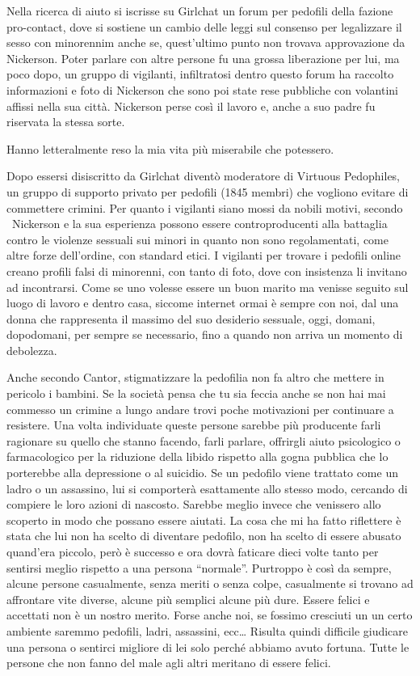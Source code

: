 \documentclass[12pt]{book} %
\begin{document}
Nella ricerca di aiuto si iscrisse su Girlchat un forum per pedofili della fazione
{\textquotedbl}pro-contact{\textquotedbl}, dove si sostiene un cambio delle leggi sul consenso per legalizzare il sesso
con minorennim anche se, quest'ultimo punto non trovava approvazione da Nickerson. Poter parlare con altre persone fu
una grossa liberazione per lui, ma poco dopo, un gruppo di vigilanti, infiltratosi dentro questo forum ha raccolto
informazioni e foto di Nickerson che sono poi state rese pubbliche con volantini affissi nella sua città. Nickerson
perse così il lavoro e, anche a suo padre fu riservata la stessa sorte.

{\textquotedbl}Hanno letteralmente reso la mia vita più miserabile che potessero{\textquotedbl}.

Dopo essersi disiscritto da Girlchat diventò moderatore di Virtuous Pedophiles, un gruppo di supporto privato per
pedofili (1845 membri) che vogliono evitare di commettere crimini. Per quanto i vigilanti siano mossi da nobili motivi,
secondo \ Nickerson e la sua esperienza possono essere controproducenti alla battaglia contro le violenze sessuali sui
minori in quanto non sono regolamentati, come altre forze dell'ordine, con standard etici. I
vigilanti per trovare i pedofili online creano profili falsi di minorenni, con tanto di foto, dove con insistenza li
invitano ad incontrarsi. Come se uno volesse essere un buon marito ma venisse seguito sul luogo di lavoro e dentro
casa, siccome internet ormai è sempre con noi, dal una donna che rappresenta il massimo del suo desiderio sessuale,
oggi, domani, dopodomani, per sempre se necessario, fino a quando non arriva un momento di debolezza.

Anche secondo Cantor, stigmatizzare la pedofilia non fa altro che mettere in pericolo i bambini. Se la società pensa che
tu sia feccia anche se non hai mai commesso un crimine a lungo andare trovi poche motivazioni per continuare a
resistere. Una volta individuate queste persone sarebbe più producente farli ragionare su quello che stanno facendo,
farli parlare, offrirgli aiuto psicologico o farmacologico per la riduzione della libido rispetto alla gogna pubblica
che lo porterebbe alla depressione o al suicidio. Se un pedofilo viene trattato come un ladro o un assassino, lui si
comporterà esattamente allo stesso modo, cercando di compiere le loro azioni di nascosto. Sarebbe meglio invece che
venissero allo scoperto in modo che possano essere aiutati. La cosa che mi ha fatto riflettere è stata che lui non ha
scelto di diventare pedofilo, non ha scelto di essere abusato quand'era piccolo, però è successo e
ora dovrà faticare dieci volte tanto per sentirsi meglio rispetto a una persona “normale”. Purtroppo è così da sempre,
alcune persone casualmente, senza meriti o senza colpe, casualmente si trovano ad affrontare vite diverse, alcune più
semplici alcune più dure. Essere felici e accettati non è un nostro merito. Forse anche noi, se fossimo cresciuti un un
certo ambiente saremmo pedofili, ladri, assassini, ecc… Risulta quindi difficile giudicare una persona o sentirci
migliore di lei solo perché abbiamo avuto fortuna. Tutte le persone che non fanno del male agli altri meritano di
essere felici.
\end{document}
